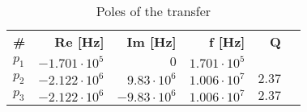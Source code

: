 \begin{table}[H]
\centering
\begin{tabular}[c]{lrrrrr}
\textbf{\#} & \textbf{Re [Hz]} & \textbf{Im [Hz]} & \textbf{f [Hz]} & \textbf{Q} \\ 
\rowcolor{myyellow}
$p_{1}$ &$-1.701 \cdot 10^{5}$ &$0$ &$1.701 \cdot 10^{5}$ \\ 
$p_{2}$ &$-2.122 \cdot 10^{6}$ &$9.83 \cdot 10^{6}$ &$1.006 \cdot 10^{7}$ &$2.37$ \\ 
\rowcolor{myyellow}
$p_{3}$ &$-2.122 \cdot 10^{6}$ &$-9.83 \cdot 10^{6}$ &$1.006 \cdot 10^{7}$ &$2.37$ \\ 
\end{tabular}
\caption{Poles of the transfer}
\label{tab-poles}
\end{table}

